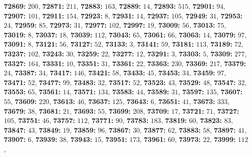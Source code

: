 \textsf{\bfseries 72869:} $200$, \textsf{\bfseries 72871:} $211$, \textsf{\bfseries 72883:} $163$, \textsf{\bfseries 72889:} $14$, \textsf{\bfseries 72893:} $515$, \textsf{\bfseries 72901:} $94$, \textsf{\bfseries 72907:} $101$, \textsf{\bfseries 72911:} $154$, \textsf{\bfseries 72923:} $8$, \textsf{\bfseries 72931:} $14$, \textsf{\bfseries 72937:} $105$, \textsf{\bfseries 72949:} $31$, \textsf{\bfseries 72953:} $24$, \textsf{\bfseries 72959:} $85$, \textsf{\bfseries 72973:} $31$, \textsf{\bfseries 72977:} $102$, \textsf{\bfseries 72997:} $19$, \textsf{\bfseries 73009:} $56$, \textsf{\bfseries 73013:} $75$, \textsf{\bfseries 73019:} $8$, \textsf{\bfseries 73037:} $18$, \textsf{\bfseries 73039:} $112$, \textsf{\bfseries 73043:} $65$, \textsf{\bfseries 73061:} $66$, \textsf{\bfseries 73063:} $14$, \textsf{\bfseries 73079:} $97$, \textsf{\bfseries 73091:} $8$, \textsf{\bfseries 73121:} $56$, \textsf{\bfseries 73127:} $52$, \textsf{\bfseries 73133:} $3$, \textsf{\bfseries 73141:} $59$, \textsf{\bfseries 73181:} $113$, \textsf{\bfseries 73189:} $72$, \textsf{\bfseries 73237:} $102$, \textsf{\bfseries 73243:} $30$, \textsf{\bfseries 73259:} $22$, \textsf{\bfseries 73277:} $12$, \textsf{\bfseries 73291:} $3$, \textsf{\bfseries 73303:} $5$, \textsf{\bfseries 73309:} $277$, \textsf{\bfseries 73327:} $164$, \textsf{\bfseries 73331:} $10$, \textsf{\bfseries 73351:} $31$, \textsf{\bfseries 73361:} $22$, \textsf{\bfseries 73363:} $230$, \textsf{\bfseries 73369:} $217$, \textsf{\bfseries 73379:} $24$, \textsf{\bfseries 73387:} $34$, \textsf{\bfseries 73417:} $146$, \textsf{\bfseries 73421:} $58$, \textsf{\bfseries 73433:} $45$, \textsf{\bfseries 73453:} $34$, \textsf{\bfseries 73459:} $97$, \textsf{\bfseries 73471:} $52$, \textsf{\bfseries 73477:} $99$, \textsf{\bfseries 73483:} $32$, \textsf{\bfseries 73517:} $52$, \textsf{\bfseries 73523:} $43$, \textsf{\bfseries 73529:} $48$, \textsf{\bfseries 73547:} $32$, \textsf{\bfseries 73553:} $65$, \textsf{\bfseries 73561:} $14$, \textsf{\bfseries 73571:} $134$, \textsf{\bfseries 73583:} $44$, \textsf{\bfseries 73589:} $31$, \textsf{\bfseries 73597:} $135$, \textsf{\bfseries 73607:} $55$, \textsf{\bfseries 73609:} $220$, \textsf{\bfseries 73613:} $46$, \textsf{\bfseries 73637:} $125$, \textsf{\bfseries 73643:} $6$, \textsf{\bfseries 73651:} $41$, \textsf{\bfseries 73673:} $333$, \textsf{\bfseries 73679:} $38$, \textsf{\bfseries 73681:} $21$, \textsf{\bfseries 73693:} $55$, \textsf{\bfseries 73699:} $208$, \textsf{\bfseries 73709:} $17$, \textsf{\bfseries 73721:} $71$, \textsf{\bfseries 73727:} $105$, \textsf{\bfseries 73751:} $46$, \textsf{\bfseries 73757:} $112$, \textsf{\bfseries 73771:} $90$, \textsf{\bfseries 73783:} $183$, \textsf{\bfseries 73819:} $60$, \textsf{\bfseries 73823:} $83$, \textsf{\bfseries 73847:} $43$, \textsf{\bfseries 73849:} $19$, \textsf{\bfseries 73859:} $96$, \textsf{\bfseries 73867:} $30$, \textsf{\bfseries 73877:} $62$, \textsf{\bfseries 73883:} $58$, \textsf{\bfseries 73897:} $41$, \textsf{\bfseries 73907:} $6$, \textsf{\bfseries 73939:} $38$, \textsf{\bfseries 73943:} $15$, \textsf{\bfseries 73951:} $173$, \textsf{\bfseries 73961:} $60$, \textsf{\bfseries 73973:} $22$, \textsf{\bfseries 73999:} $112$, 
